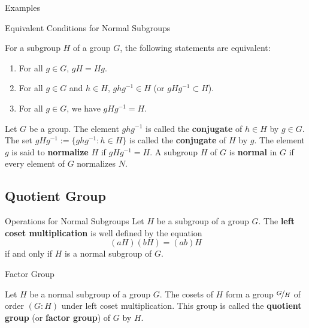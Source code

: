 \documentclass{beamer}
\begin{document}
\begin{frame}{Examples}
    
\end{frame}

\begin{frame}{Equivalent Conditions for Normal Subgroups}
\begin{theorem}
For a subgroup $H$ of a group $G$, the following statements are equivalent:
\begin{enumerate}
\item For all $g \in G$, $gH = Hg$.
\item For all $g \in G$ and $h \in H$, $ghg^{-1} \in H$ (or $gHg^{-1} \subset H$).
\item For all $g \in G$, we have $gHg^{-1}= H$.
\end{enumerate}
\end{theorem}   
\pause
\begin{definition}
\justifying
Let $G$ be a group. The element $ghg^{-1}$ is called the \textbf{conjugate} of $h \in H$ by $g \in G$. The set $gHg^{-1} := \{ghg^{-1}: h \in H\}$ is called the \textbf{conjugate} of $H$ by $g$. The element $g$ is said to \textbf{normalize} $H$ if $gHg^{-1} = H$. A subgroup $H$ of $G$ is \textbf{normal} in $G$ if every element of $G$ normalizes $N$. 
\end{definition}
\end{frame}

\subsection{Quotient Group}

\begin{frame}{Operations for Normal Subgroups}
Let $H$ be a subgroup of a group $G$. The \textbf{left coset multiplication} is well defined by the equation
\[
(aH)(bH) = (ab)H
\]
if and only if $H$ is a normal subgroup of $G$.
\end{frame}

\begin{frame}{Factor Group}
\begin{theorem}
\justifying
Let $H$ be a normal subgroup of a group $G$. The cosets of $H$ form a group $\nicefrac{G}{H}$ of order $(G:H)$ under left coset multiplication. This group is called the \textbf{quotient group} (or \textbf{factor group}) of $G$ by $H$.   
\end{theorem}
\end{frame}
\end{document}
